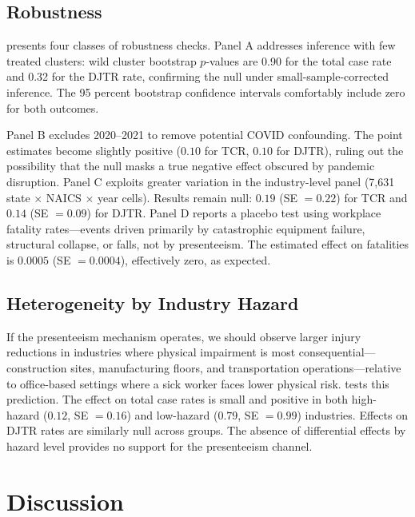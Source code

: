 \documentclass[12pt]{article}
\begin{document}


\subsection{Robustness}

 presents four classes of robustness checks. Panel A addresses inference with few treated clusters: wild cluster bootstrap $p$-values are 0.90 for the total case rate and 0.32 for the DJTR rate, confirming the null under small-sample-corrected inference. The 95 percent bootstrap confidence intervals comfortably include zero for both outcomes.

Panel B excludes 2020--2021 to remove potential COVID confounding. The point estimates become slightly positive ($0.10$ for TCR, $0.10$ for DJTR), ruling out the possibility that the null masks a true negative effect obscured by pandemic disruption. Panel C exploits greater variation in the industry-level panel (7,631 state $\times$ NAICS $\times$ year cells). Results remain null: $0.19$ (SE $= 0.22$) for TCR and $0.14$ (SE $= 0.09$) for DJTR. Panel D reports a placebo test using workplace fatality rates---events driven primarily by catastrophic equipment failure, structural collapse, or falls, not by presenteeism. The estimated effect on fatalities is $0.0005$ (SE $= 0.0004$), effectively zero, as expected.



\subsection{Heterogeneity by Industry Hazard}

If the presenteeism mechanism operates, we should observe larger injury reductions in industries where physical impairment is most consequential---construction sites, manufacturing floors, and transportation operations---relative to office-based settings where a sick worker faces lower physical risk.  tests this prediction. The effect on total case rates is small and positive in both high-hazard ($0.12$, SE $= 0.16$) and low-hazard ($0.79$, SE $= 0.99$) industries. Effects on DJTR rates are similarly null across groups. The absence of differential effects by hazard level provides no support for the presenteeism channel.




\section{Discussion}
\end{document}

